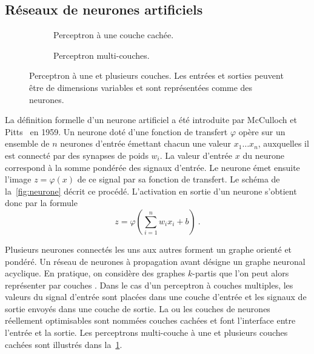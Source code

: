 \subsection{Réseaux de neurones artificiels}

\begin{figure}[t]
  \begin{subfigure}[b]{0.5\textwidth}
    \resizebox{\textwidth}{!}{
    
    }
  \caption{Perceptron à une couche cachée.}
  \end{subfigure}%
  \begin{subfigure}[b]{0.5\textwidth}
    \resizebox{\textwidth}{!}{
    
    }
  \caption{Perceptron multi-couches.}
  \end{subfigure}
  \caption{Perceptron à une et plusieurs couches. Les entrées et sorties peuvent être de dimensions variables et sont représentées comme des neurones.}
  \label{fig:perceptron}
\end{figure}

La définition formelle d'un neurone artificiel a été introduite par McCulloch et Pitts~\cite{lettvin_what_1959} en 1959. Un neurone doté d'une fonction de transfert $\varphi$ opère sur un ensemble de $n$ neurones d'entrée émettant chacun une valeur $x_1\dots{}x_n$, auxquelles il est connecté par des synapses de poids $w_i$. La valeur d'entrée $x$ du neurone correspond à la somme pondérée des signaux d'entrée. Le neurone émet ensuite l'image $z = \varphi(x)$ de ce signal par sa fonction de transfert. Le schéma de la~\cref{fig:neurone} décrit ce procédé. L'activation en sortie d'un neurone s'obtient donc par la formule
\begin{equation}
z = \varphi\left(\sum_{i=1}^n w_i x_i + b\right)~.
\end{equation}

Plusieurs neurones connectés les uns aux autres forment un graphe orienté et pondéré. Un réseau de neurones à propagation avant désigne un graphe neuronal acyclique. En pratique, on considère des graphes $k$-partis que l'on peut alors représenter par \og couches \fg. Dans le cas d'un perceptron à couches multiples, les valeurs du signal d'entrée sont placées dans une couche d'entrée et les signaux de sortie envoyés dans une couche de sortie. La ou les couches de neurones réellement optimisables sont nommées \og couches cachées \fg{} et font l'interface entre l'entrée et la sortie. Les perceptrons multi-couche à une et plusieurs couches cachées sont illustrés dans la~\cref{fig:perceptron}.

